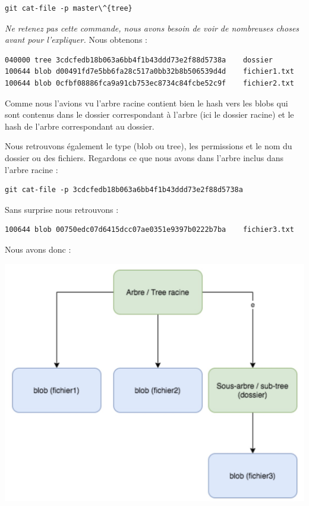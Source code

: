 \documentclass{article}
\begin{document}
\begin{verbatim}
git cat-file -p master\^{tree}
\end{verbatim}
{\it 
Ne retenez pas cette commande, nous avons besoin de voir de nombreuses choses avant pour l'expliquer.} Nous obtenons :
\begin{verbatim}
040000 tree 3cdcfedb18b063a6bb4f1b43ddd73e2f88d5738a	dossier
100644 blob d00491fd7e5bb6fa28c517a0bb32b8b506539d4d	fichier1.txt
100644 blob 0cfbf08886fca9a91cb753ec8734c84fcbe52c9f	fichier2.txt
\end{verbatim}
Comme nous l'avions vu l'arbre racine contient bien le {\color{blue}hash} vers les {\color{blue}blobs} qui sont contenus dans le dossier correspondant à l'arbre (ici le dossier racine) et le {\color{blue}hash} de l'arbre correspondant au dossier.

Nous retrouvons également le type ({\color{blue}blob} ou {\color{blue}tree}), les permissions et le nom du dossier ou des fichiers. Regardons ce que nous avons dans l'arbre inclus dans l'arbre racine :


\begin{verbatim}
git cat-file -p 3cdcfedb18b063a6bb4f1b43ddd73e2f88d5738a
\end{verbatim}

Sans surprise nous retrouvons :
\begin{verbatim}
100644 blob 00750edc07d6415dcc07ae0351e9397b0222b7ba	fichier3.txt
\end{verbatim}
Nous avons donc :
\begin{center}
\includegraphics[scale=0.25]{image03.jpg} 
\end{center}
\end{document}
